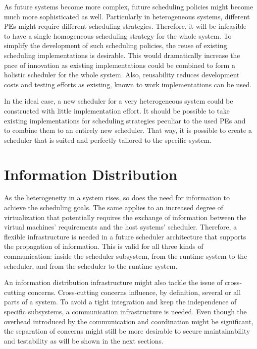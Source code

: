 As future systems become more complex, future scheduling policies might become much more sophisticated as well. Particularly in heterogeneous systems, different \acp{PE} might require different scheduling strategies. Therefore, it will be infeasible to have a single homogeneous scheduling strategy for the whole system. To simplify the development of such scheduling policies, the reuse of existing scheduling implementations is desirable. This would dramatically increase the pace of innovation as existing implementations could be combined to form a holistic scheduler for the whole system. Also, reusability reduces development costs and testing efforts as existing, known to work implementations can be used.

In the ideal case, a new scheduler for a very heterogeneous system could be constructed with little implementation effort. It should be possible to take existing implementations for scheduling strategies peculiar to the used \acp{PE} and to combine them to an entirely new scheduler. That way, it is possible to create a scheduler that is suited and perfectly tailored to the specific system.

\section{Information Distribution}

As the heterogeneity in a system rises, so does the need for information to achieve the scheduling goals. The same applies to an increased degree of virtualization that potentially requires the exchange of information between the virtual machines' requirements and the host systems' scheduler. Therefore, a flexible infrastructure is needed in a future scheduler architecture that supports the propagation of information. This is valid for all three kinds of communication: inside the scheduler subsystem, from the runtime system to the scheduler, and from the scheduler to the runtime system.

An information distribution infrastructure might also tackle the issue of cross-cutting concerns. Cross-cutting concerns influence, by definition, several or all parts of a system. To avoid a tight integration and keep the independence of specific subsystems, a communication infrastructure is needed. Even though the overhead introduced by the communication and coordination might be significant, the separation of concerns might still be more desirable to secure maintainability and testability as will be shown in the next sections.
